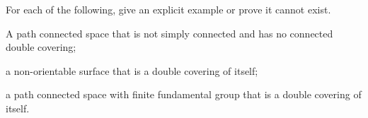 For each of the following, give an explicit example or prove it cannot
exist.
\begin{alist}
\item A path connected space that is not simply connected and has no
connected double covering;
\item a non-orientable surface that is a double covering of itself;
\item a path connected space with finite fundamental group that is a
double covering of itself.
\end{alist}
